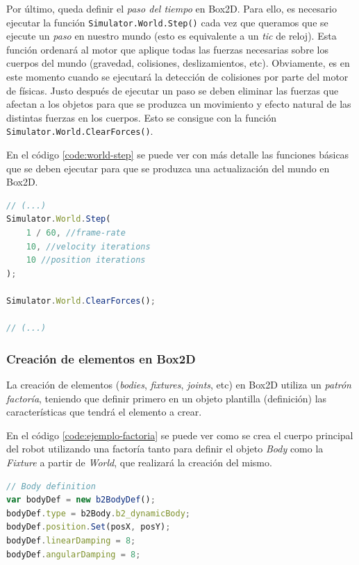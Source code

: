 {Por último, queda definir el \emph{paso del tiempo} en Box2D. Para ello, es necesario ejecutar la función \texttt{Simulator.World.Step()} cada vez que queramos que se ejecute un \emph{paso} en nuestro mundo (esto es equivalente a un \emph{tic} de reloj). Esta función ordenará al motor que aplique todas las fuerzas necesarias sobre los cuerpos del mundo (gravedad, colisiones, deslizamientos, etc). Obviamente, es en este momento cuando se ejecutará la detección de colisiones por parte del motor de físicas. Justo después de ejecutar un paso se deben eliminar las fuerzas que afectan a los objetos para que se produzca un movimiento y efecto natural de las distintas fuerzas en los cuerpos. Esto se consigue con la función \texttt{Simulator.World.ClearForces()}.

En el código \ref{code:world-step} se puede ver con más detalle las funciones básicas que se deben ejecutar para que se produzca una actualización del mundo en Box2D.

\begin{lstlisting}[language={Javascript},label={code:world-step}, caption={Actualización del mundo en \texttt{Box2D}.}]
// (...)
Simulator.World.Step(
	1 / 60, //frame-rate
	10, //velocity iterations
	10 //position iterations
);

Simulator.World.ClearForces();

// (...)
\end{lstlisting}


\subsubsection{Creación de elementos en Box2D}


La creación de elementos (\emph{bodies}, \emph{fixtures}, \emph{joints}, etc) en Box2D utiliza un \emph{patrón factoría}, teniendo que definir primero en un objeto plantilla (definición) las características que tendrá el elemento a crear.

En el código \ref{code:ejemplo-factoria} se puede ver como se crea el cuerpo principal del robot utilizando una factoría tanto para definir el objeto \emph{Body} como la \emph{Fixture} a partir de \emph{World}, que realizará la creación del mismo.

\begin{lstlisting}[language={Javascript},label={code:ejemplo-factoria}, caption={Creación del cuerpo principal del robot utilizando la librería Box2dweb.}]
// Body definition
var bodyDef = new b2BodyDef(); 
bodyDef.type = b2Body.b2_dynamicBody;
bodyDef.position.Set(posX, posY);
bodyDef.linearDamping = 8;
bodyDef.angularDamping = 8;


\end{lstlisting}}
